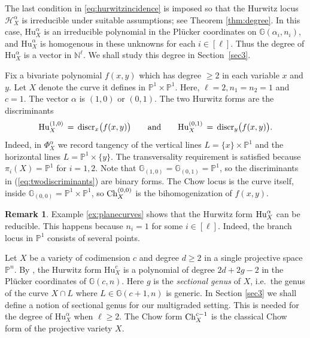 \documentclass[12pt]{article}
\theoremstyle{definition}
\newtheorem{remark}[theorem]{Remark}
\newenvironment{example}
{\pushQED{\qed}\renewcommand{\qedsymbol}{$\diamond$}\examplex}
{\popQED\endexamplex}
\newcommand{\bN}{\mathbb N}
\newcommand{\bG}{\mathbb G}
\newcommand{\bP}{\mathbb P}
\newcommand{\cH}{\mathcal H}
\begin{document}
The last condition in \eqref{eq:hurwitzincidence} is imposed so that the Hurwitz locus $\cH_X^\alpha$ is irreducible under suitable assumptions; see Theorem \ref{thm:degree}.
 In this case, $\mathrm{Hu}_X^\alpha$ is an irreducible polynomial in the Pl\"ucker coordinates on $\bG(\alpha_i,n_i)$,
and $\mathrm{Hu}_X^\alpha$ is homogenous in these unknowns for each $i \in [\ell]$.
Thus the degree of $\mathrm{Hu}_X^\alpha$ is a vector in $\bN^\ell$.
We shall study this degree in Section~\ref{sec3}.

\begin{example}[Plane curves] \label{ex:planecurves}
Fix a bivariate polynomial $f(x,y)$ which has degree $\geq 2$ in each variable $x$ and $y$.
Let $X$ denote the curve it defines in $\bP^1 \times \bP^1$. Here,
$\ell =2, n_1=n_2=1$ and $c=1$. The vector $\alpha$ is $(1,0)$ or $(0,1)$.
The two Hurwitz forms are the discriminants
\begin{equation}
\label{eq:twodiscriminants}
  \mathrm{Hu}_X^{(1,0)} \,= \, {\rm discr}_x \bigl(f(x,y) \bigr) 
 \qquad {\rm and} \qquad
  \mathrm{Hu}_X^{(0,1)} \,= \, {\rm discr}_y \bigl(f(x,y) \bigr) .
\end{equation} 
Indeed, in  $\Phi^\alpha_X$ we record tangency of the vertical lines
$L = \{x\} \times \bP^1$ and the horizontal lines 
$L = \bP^1 \times \{y\}$. The transversality
requirement is satisfied because $\pi_i(X) = \bP^1$ for $i=1,2$.
Note that $\bG_{(1,0)} = \bG_{(0,1)} = \bP^1$, so the discriminants
in (\ref{eq:twodiscriminants}) are binary forms. The Chow locus
is the curve itself, inside $\bG_{(0,0)} = \bP^1 \times \bP^1$, so
${\rm Ch}_X^{(0,0)}$ is the bihomogenization of $f(x,y)$.
\end{example}

\begin{remark} \label{rmk:reduciblehurwitz}
Example \ref{ex:planecurves} shows that
the Hurwitz form ${\rm Hu}^\alpha_X$ can be reducible.
This happens because  $n_i = 1$ for some $i  \in [\ell]$.
Indeed, the branch locus in $\bP^1$ consists of several points.
\end{remark}

\begin{example}[$\ell=1$]
Let $X$ be a variety of codimension $c$ and degree $d \geq 2$
in a single projective space $\bP^n$.
By \cite{hurwitz}, the Hurwitz form $\mathrm{Hu}^c_X$ is a polynomial
of degree $2d+2g-2$ in the Pl\"ucker coordinates of $\bG(c,n)$.
Here $g$ is the {\em sectional genus} of $X$, i.e.~the
genus of the curve
$X \cap L$ where $L \in \bG(c+1,n)$ is generic.
In Section \ref{sec3} we  shall define
a notion of sectional genus for our
multigraded setting.
This is needed for the degree of $\mathrm{Hu}^\alpha_X$ when $\ell \geq 2$.
The Chow form ${\rm Ch}^{c-1}_X$ is the classical Chow form \cite{CW, JKSS} of the
projective variety $X$.
\end{example}
\end{document}
